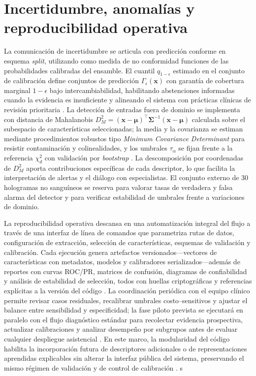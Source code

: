 \section{Incertidumbre, anomalías y reproducibilidad operativa}
La comunicación de incertidumbre se articula con predicción conforme en esquema \emph{split}, utilizando como medida de no conformidad funciones de las probabilidades calibradas del ensamble. El cuantil \(q_{1-\epsilon}\) estimado en el conjunto de calibración define conjuntos de predicción \(\Gamma_{\epsilon}(\mathbf{x})\) con garantía de cobertura marginal \(1-\epsilon\) bajo intercambiabilidad, habilitando abstenciones informadas cuando la evidencia es insuficiente y alineando el sistema con prácticas clínicas de revisión prioritaria \cite{Montero2024}. La detección de entradas fuera de dominio se implementa con distancia de Mahalanobis \(D_{M}^{2}=(\mathbf{x}-\boldsymbol{\mu})^{\top}\boldsymbol{\Sigma}^{-1}(\mathbf{x}-\boldsymbol{\mu})\) calculada sobre el subespacio de características seleccionadas; la media y la covarianza se estiman mediante procedimientos robustos tipo \emph{Minimum Covariance Determinant} para resistir contaminación y colinealidades, y los umbrales \(\tau_{\alpha}\) se fijan frente a la referencia \(\chi^{2}_{d}\) con validación por \emph{bootstrap} \cite{Mahalanobis1936,Rousseeuw2019}. La descomposición por coordenadas de \(D_{M}^{2}\) aporta contribuciones específicas de cada descriptor, lo que facilita la interpretación de alertas y el diálogo con especialistas. El conjunto externo de 30 hologramas no sanguíneos se reserva para valorar tasas de verdadera y falsa alarma del detector y para verificar estabilidad de umbrales frente a variaciones de dominio. 

La reproducibilidad operativa descansa en una automatización integral del flujo a través de una interfaz de línea de comandos que parametriza rutas de datos, configuración de extracción, selección de características, esquemas de validación y calibración. Cada ejecución genera artefactos versionados—vectores de características con metadatos, modelos y calibradores serializados—además de reportes con curvas ROC/PR, matrices de confusión, diagramas de confiabilidad y análisis de estabilidad de selección, todos con huellas criptográficas y referencias explícitas a la versión del código \cite{Tsamardinos2022,EAFIT2018}. La coordinación periódica con el equipo clínico permite revisar casos residuales, recalibrar umbrales costo–sensitivos y ajustar el balance entre sensibilidad y especificidad; la fase piloto prevista se ejecutará en paralelo con el flujo diagnóstico estándar para recolectar evidencia prospectiva, actualizar calibraciones y analizar desempeño por subgrupos antes de evaluar cualquier despliegue asistencial \cite{Montero2024}. En este marco, la modularidad del código habilita la incorporación futura de descriptores adicionales o de representaciones aprendidas explicables sin alterar la interfaz pública del sistema, preservando el mismo régimen de validación y de control de calibración \cite{Amann2019,OConnor2020,BuitragoDuque2023,Pedregosa2011}.
s